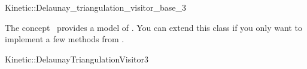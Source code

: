 

\begin{ccRefClass}{Kinetic::Delaunay_triangulation_visitor_base_3}


\ccDefinition
  
The concept \ccRefName\ provides a model of
. You can extend this class if you only
want to implement a few methods from .

\ccIsModel

Kinetic::DelaunayTriangulationVisitor3

\ccCreation
{}  %


\ccSeeAlso



\end{ccRefClass}


